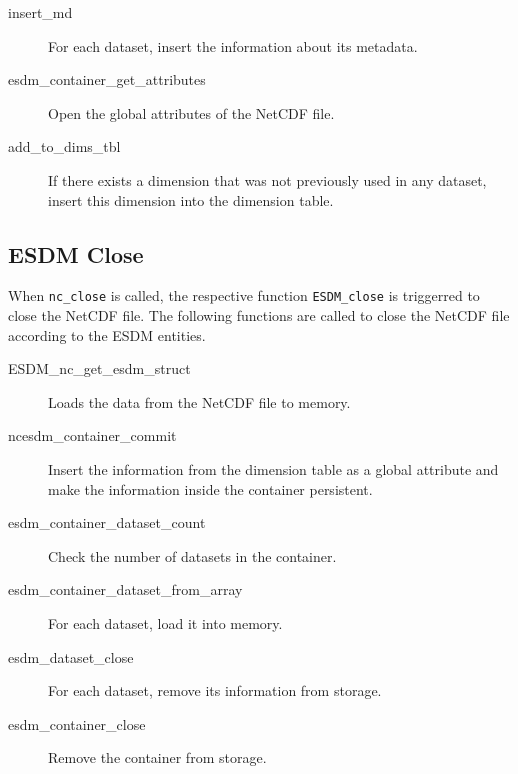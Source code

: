 \begin{description}
\item[insert\_md]

For each dataset, insert the information about its metadata.

\item[esdm\_container\_get\_attributes]

Open the global attributes of the NetCDF file.

\item[add\_to\_dims\_tbl]

If there exists a dimension that was not previously used in any dataset, insert this dimension into the dimension table.

\end{description}

\subsection{ESDM Close}

When \texttt{nc\_close} is called, the respective function \texttt{ESDM\_close} is triggerred to close the NetCDF file.
The following functions are called to close the NetCDF file according to the ESDM entities.

\begin{description}

\item[ESDM\_nc\_get\_esdm\_struct]

Loads the data from the NetCDF file to memory.

\item[ncesdm\_container\_commit]

Insert the information from the dimension table as a global attribute and make the information inside the container persistent.

\item[esdm\_container\_dataset\_count]

Check the number of datasets in the container.

\item[esdm\_container\_dataset\_from\_array]

For each dataset, load it into memory.

\item[esdm\_dataset\_close]

For each dataset, remove its information from storage.

\item[esdm\_container\_close]

Remove the container from storage.

\end{description}

